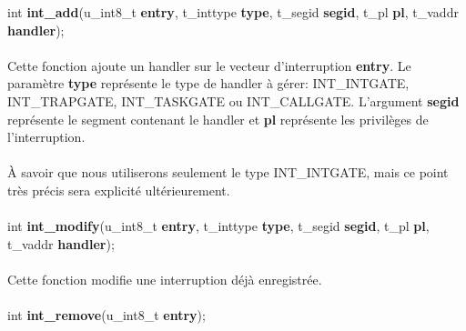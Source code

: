 \documentclass[10pt,a4wide]{article}
\begin{document}
\hspace{1.5cm}int \textbf{int\_add}(u\_int8\_t \textbf{entry},
                                    t\_inttype \textbf{type},
                                    t\_segid \textbf{segid},
                                    t\_pl \textbf{pl},
                                    t\_vaddr \textbf{handler});

\paragraph{}

Cette fonction ajoute un handler sur le vecteur d'interruption \textbf{entry}.
Le param\`etre \textbf{type} repr\'esente le type de handler \`a g\'erer:
INT\_INTGATE, INT\_TRAPGATE, INT\_TASKGATE ou INT\_CALLGATE. L'argument
\textbf{segid} repr\'esente le segment contenant le handler et \textbf{pl}
repr\'esente les privil\`eges de l'interruption.

\paragraph{}

\`A savoir que nous utiliserons seulement le type INT\_INTGATE, mais
ce point tr\`es pr\'ecis sera explicit\'e ult\'erieurement.

\paragraph{}

\hspace{1.5cm}int \textbf{int\_modify}(u\_int8\_t \textbf{entry},
                                       t\_inttype \textbf{type},
                                       t\_segid \textbf{segid},
                                       t\_pl \textbf{pl},
                                       t\_vaddr \textbf{handler});

\paragraph{}

Cette fonction modifie une interruption d\'ej\`a enregistr\'ee.

\paragraph{}

\hspace{1.5cm}int \textbf{int\_remove}(u\_int8\_t \textbf{entry});
\end{document}
